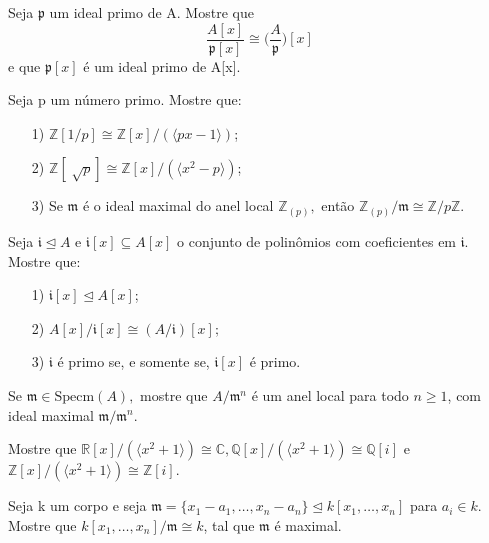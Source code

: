 \documentclass[AlgebraII/algebraII_notes.tex]{subfiles}
\begin{document}
\begin{prop*}[Exercício]
	Seja \(\mathfrak{p}\) um ideal primo de A. Mostre que
	\[
		\frac{A[x]}{\mathfrak{p}[x]}\cong{\biggl(\frac{A}{\mathfrak{p}}\biggr)}[x]
	\]
	e que \(\mathfrak{p}[x]\) é um ideal primo de A[x].
\end{prop*}
\begin{example}[Exercício]
	Seja p um número primo. Mostre que:
	\begin{itemize}
		\item[1)] \(\mathbb{Z}[1/p]\cong \mathbb{Z}[x]/(\langle px-1 \rangle)\);
		\item[2)] \(\mathbb{Z}[\sqrt[]{p}]\cong \mathbb{Z}[x]/(\langle x^{2}-p \rangle)\);
		\item[3)] Se \(\mathfrak{m}\) é o ideal maximal do anel local \(\mathbb{Z}_{(p)},\) então \(\mathbb{Z}_{(p)}/\mathfrak{m}\cong{\mathbb{Z}/p \mathbb{Z}}.\)
	\end{itemize}
\end{example}
\begin{prop*}[Exercício]
	Seja \(\mathfrak{i}\trianglelefteq{A}\) e \(\mathfrak{i}[x]\subseteq A[x]\) o conjunto de polinômios
	com coeficientes em \(\mathfrak{i}.\) Mostre que:
	\begin{itemize}
		\item[1)] \(\mathfrak{i}[x] \trianglelefteq{A[x]}\);
		\item[2)] \(A[x]/\mathfrak{i}[x]\cong{(A/\mathfrak{i})}[x];\)
		\item[3)] \(\mathfrak{i}\) é primo se, e somente se, \(\mathfrak{i}[x]\) é primo.
	\end{itemize}
\end{prop*}
\begin{prop*}[Exercício]
	Se \(\mathfrak{m}\in \mathrm{Specm}(A),\) mostre que \(A/\mathfrak{m}^{n}\) é um anel local para todo
	\(n \geq 1\), com ideal maximal \(\mathfrak{m}/\mathfrak{m}^{n}.\)
\end{prop*}
\begin{example}[Exercício]
	Mostre que \(\mathbb{R}[x]/(\langle x^{2}+1 \rangle)\cong{\mathbb{C}}, \mathbb{Q}[x]/(\langle x^{2}+1 \rangle)\cong{\mathbb{Q}[i]}\)
	e \(\mathbb{Z}[x]/(\langle x^{2}+1 \rangle)\cong{\mathbb{Z}[i]}.\)
\end{example}
\begin{prop*}[Exercício]
	Seja k um corpo e seja \(\mathfrak{m} = \{x_{1}-a_{1}, \dotsc, x_{n}-a_{n}\}\trianglelefteq{k[x_{1}, \dotsc, x_{n}]}\) para
	\(a_{i}\in k.\) Mostre que \(k[x_{1}, \dotsc, x_{n}]/\mathfrak{m}\cong{k}\), tal que \(\mathfrak{m}\) é maximal.
\end{prop*}
\end{document}

